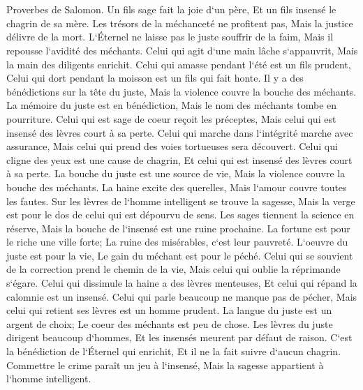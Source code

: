 \chapter{}

\verse Proverbes de Salomon. Un fils sage fait la joie d`un père, Et un fils insensé le chagrin de sa mère. 
\verse Les trésors de la méchanceté ne profitent pas, Mais la justice délivre de la mort. 
\verse L`Éternel ne laisse pas le juste souffrir de la faim, Mais il repousse l`avidité des méchants. 
\verse Celui qui agit d`une main lâche s`appauvrit, Mais la main des diligents enrichit. 
\verse Celui qui amasse pendant l`été est un fils prudent, Celui qui dort pendant la moisson est un fils qui fait honte. 
\verse Il y a des bénédictions sur la tête du juste, Mais la violence couvre la bouche des méchants. 
\verse La mémoire du juste est en bénédiction, Mais le nom des méchants tombe en pourriture. 
\verse Celui qui est sage de coeur reçoit les préceptes, Mais celui qui est insensé des lèvres court à sa perte. 
\verse Celui qui marche dans l`intégrité marche avec assurance, Mais celui qui prend des voies tortueuses sera découvert. 
\verse Celui qui cligne des yeux est une cause de chagrin, Et celui qui est insensé des lèvres court à sa perte. 
\verse La bouche du juste est une source de vie, Mais la violence couvre la bouche des méchants. 
\verse La haine excite des querelles, Mais l`amour couvre toutes les fautes. 
\verse Sur les lèvres de l`homme intelligent se trouve la sagesse, Mais la verge est pour le dos de celui qui est dépourvu de sens. 
\verse Les sages tiennent la science en réserve, Mais la bouche de l`insensé est une ruine prochaine. 
\verse La fortune est pour le riche une ville forte; La ruine des misérables, c`est leur pauvreté. 
\verse L`oeuvre du juste est pour la vie, Le gain du méchant est pour le péché. 
\verse Celui qui se souvient de la correction prend le chemin de la vie, Mais celui qui oublie la réprimande s`égare. 
\verse Celui qui dissimule la haine a des lèvres menteuses, Et celui qui répand la calomnie est un insensé. 
\verse Celui qui parle beaucoup ne manque pas de pécher, Mais celui qui retient ses lèvres est un homme prudent. 
\verse La langue du juste est un argent de choix; Le coeur des méchants est peu de chose. 
\verse Les lèvres du juste dirigent beaucoup d`hommes, Et les insensés meurent par défaut de raison. 
\verse C`est la bénédiction de l`Éternel qui enrichit, Et il ne la fait suivre d`aucun chagrin. 
\verse Commettre le crime paraît un jeu à l`insensé, Mais la sagesse appartient à l`homme intelligent. 

